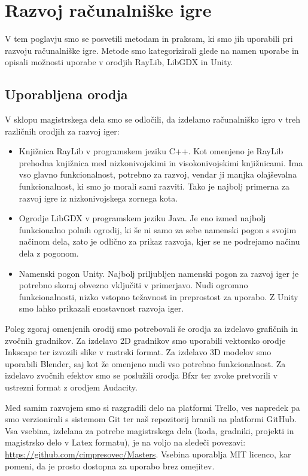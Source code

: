 \documentclass[12pt,a4paper,twoside]{book}
\begin{document}
\chapter{Razvoj računalniške igre}\thispagestyle{fancy}
\label{chapter:razvojIger}
V tem poglavju smo se posvetili metodam in praksam, ki smo jih uporabili pri razvoju računalniške igre. Metode smo kategorizirali glede na namen uporabe in opisali možnosti uporabe v orodjih RayLib, LibGDX in Unity.
\section{Uporabljena orodja}
V sklopu magistrskega dela smo se odločili, da izdelamo računalniško igro v treh različnih orodjih za razvoj iger:
\begin{itemize}
	\item Knjižnica RayLib v programskem jeziku C++. Kot omenjeno je RayLib prehodna knjižnica med nizkonivojskimi in visokonivojskimi knjižnicami. Ima vso glavno funkcionalnost, potrebno za razvoj, vendar ji manjka olajševalna funkcionalnost, ki smo jo morali sami razviti. Tako je najbolj primerna za razvoj igre iz nizkonivojskega zornega kota.
	\item Ogrodje LibGDX v programskem jeziku Java. Je eno izmed najbolj funkcionalno polnih ogrodij, ki še ni samo za sebe namenski pogon s svojim načinom dela, zato je odlično za prikaz razvoja, kjer se ne podrejamo načinu dela z pogonom.
	\item Namenski pogon Unity. Najbolj priljubljen namenski pogon za razvoj iger je potrebno skoraj obvezno vključiti v primerjavo. Nudi ogromno funkcionalnosti, nizko vstopno težavnost in preprostost za uporabo. Z Unity smo lahko prikazali enostavnost razvoja iger.
\end{itemize}

Poleg zgoraj omenjenih orodij smo potrebovali še orodja za izdelavo grafičnih in zvočnih gradnikov. Za izdelavo 2D gradnikov smo uporabili vektorsko orodje Inkscape ter izvozili slike v rastrski format. Za izdelavo 3D modelov smo uporabili Blender, saj kot že omenjeno nudi vso potrebno funkcionalnost. Za izdelavo zvočnih efektov smo se poslužili orodja Bfxr ter zvoke pretvorili v ustrezni format z orodjem Audacity.

Med samim razvojem smo si razgradili delo na platformi Trello, ves napredek pa smo verzionirali s sistemom Git ter naš repozitorij hranili na platformi GitHub. Vsa vsebina, izdelana za potrebe magistrskega dela (koda, gradniki, projekti in magistrsko delo v Latex formatu), je na voljo na sledeči povezavi: \url{https://github.com/cimpresovec/Masters}. Vsebina uporablja MIT licenco, kar pomeni, da je prosto dostopna za uporabo brez omejitev.
\end{document}
